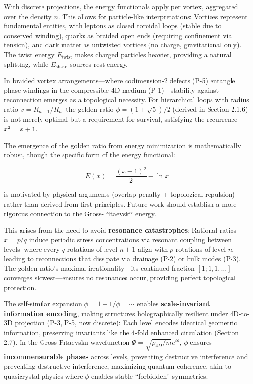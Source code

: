 With discrete projections, the energy functionals apply per vortex, aggregated over the density $\bar{n}$. This allows for particle-like interpretations: Vortices represent fundamental entities, with leptons as closed toroidal loops (stable due to conserved winding), quarks as braided open ends (requiring confinement via tension), and dark matter as untwisted vortices (no charge, gravitational only). The twist energy $E_{\text{twist}}$ makes charged particles heavier, providing a natural splitting, while $E_{\text{shake}}$ sources rest energy.

In braided vortex arrangements---where codimension-2 defects (P-5) entangle phase windings in the compressible 4D medium (P-1)---stability against reconnection emerges as a topological necessity. For hierarchical loops with radius ratio $x = R_{n+1}/R_n$, the golden ratio $\phi = (1 + \sqrt{5})/2$ (derived in Section 2.1.6) is not merely optimal but a requirement for survival, satisfying the recurrence $x^2 = x + 1$.

The emergence of the golden ratio from energy minimization is mathematically robust, though the specific form of the energy functional:

\begin{equation}
E(x) = \frac{(x-1)^2}{2} - \ln x
\end{equation}

is motivated by physical arguments (overlap penalty + topological repulsion) rather than derived from first principles. Future work should establish a more rigorous connection to the Gross-Pitaevskii energy.

This arises from the need to avoid \textbf{resonance catastrophes}: Rational ratios $x = p/q$ induce periodic stress concentrations via resonant coupling between levels, where every $q$ rotations of level $n+1$ align with $p$ rotations of level $n$, leading to reconnections that dissipate via drainage (P-2) or bulk modes (P-3). The golden ratio's maximal irrationality---its continued fraction $[1; 1, 1, \ldots]$ converges slowest---ensures no resonances occur, providing perfect topological protection.

The self-similar expansion $\phi = 1 + 1/\phi = \cdots$ enables \textbf{scale-invariant information encoding}, making structures holographically resilient under 4D-to-3D projection (P-3, P-5, now discrete): Each level encodes identical geometric information, preserving invariants like the 4-fold enhanced circulation (Section 2.7). In the Gross-Pitaevskii wavefunction $\Psi = \sqrt{\rho_{4D}/m} e^{i \theta}$, $\phi$ ensures \textbf{incommensurable phases} across levels, preventing destructive interference and preventing destructive interference, maximizing quantum coherence, akin to quasicrystal physics where $\phi$ enables stable ``forbidden'' symmetries.

